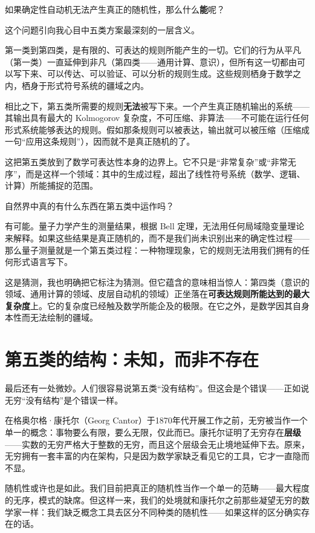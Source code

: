 \documentclass[11pt, twoside, openright]{book}
\begin{document}
如果确定性自动机无法产生真正的随机性，那么什么\textbf{能}呢？

这个问题引向我心目中五类方案最深刻的一层含义。

第一类到第四类，是有限的、可表达的规则所能产生的一切。它们的行为从平凡（第一类）一直延伸到非凡（第四类------通用计算、意识），但所有这一切都由可以写下来、可以传达、可以验证、可以分析的规则生成。这些规则栖身于数学之内，栖身于形式符号系统的疆域之内。

相比之下，第五类所需要的规则\textbf{无法}被写下来。一个产生真正随机输出的系统------其输出具有最大的 Kolmogorov 复杂度，不可压缩、非算法------不可能在运行任何形式系统能够表达的规则。假如那条规则可以被表达，输出就可以被压缩（压缩成一句“应用这条规则”），因而就不是真正随机的了。

这把第五类放到了数学可表达性本身的边界上。它不只是“非常复杂”或“非常无序”，而是这样一个领域：其中的生成过程，超出了线性符号系统（数学、逻辑、计算）所能捕捉的范围。

自然界中真的有什么东西在第五类中运作吗？

有可能。量子力学产生的测量结果，根据 Bell 定理，无法用任何局域隐变量理论来解释。如果这些结果是真正随机的，而不是我们尚未识别出来的确定性过程------那么量子测量就是一个第五类过程：一种物理现象，它的规则无法用我们拥有的任何形式语言写下。

这是猜测，我也明确把它标注为猜测。但它蕴含的意味相当惊人：第四类（意识的领域、通用计算的领域、皮层自动机的领域）正坐落在\textbf{可表达规则所能达到的最大复杂度}上。它的复杂度已经触及数学所能企及的极限。在它之外，是数学因其自身本性而无法绘制的疆域。

\section*{第五类的结构：未知，而非不存在}

最后还有一处微妙。人们很容易说第五类“没有结构”。但这会是个错误------正如说无穷“没有结构”是个错误一样。

在格奥尔格·康托尔（Georg Cantor）于1870年代开展工作之前，无穷被当作一个单一的概念：事物要么有限，要么无限，仅此而已。康托尔证明了无穷存在\textbf{层级}------实数的无穷严格大于整数的无穷，而且这个层级会无止境地延伸下去。原来，无穷拥有一套丰富的内在架构，只是因为数学家缺乏看见它的工具，它才一直隐而不显。

随机性或许也是如此。我们目前把真正的随机性当作一个单一的范畴------最大程度的无序，模式的缺席。但这样一来，我们的处境就和康托尔之前那些凝望无穷的数学家一样：我们缺乏概念工具去区分不同种类的随机性------如果这样的区分确实存在的话。
\end{document}
